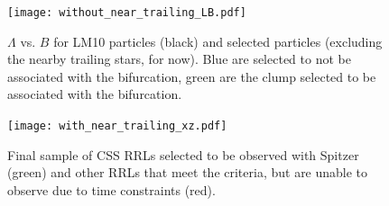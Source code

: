 \documentclass[letterpaper,12pt,preprint]{aastex}
\begin{document}
\begin{figure}
\begin{center}
\texttt{[image: without\_near\_trailing\_LB.pdf]}
\caption{ $\Lambda$ vs. $B$ for LM10 particles (black) and selected particles (excluding the nearby trailing stars, for now). Blue are selected to not be associated with the bifurcation, green are the clump selected to be associated with the bifurcation. }\label{fig:LB}
\end{center}
\end{figure}


\begin{figure}
\begin{center}
\texttt{[image: with\_near\_trailing\_xz.pdf]}
\caption{ Final sample of CSS RRLs selected to be observed with Spitzer (green) and other RRLs that meet the criteria, but are unable to observe due to time constraints (red). }\label{fig:final_sample}
\end{center}
\end{figure}
\end{document}
